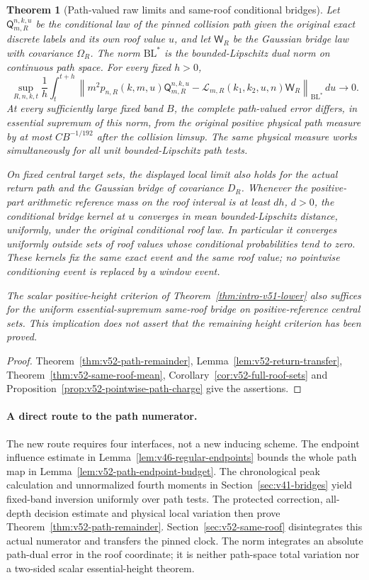 \documentclass[11pt,reqno]{amsart}
\numberwithin{equation}{section}
\newtheorem{leadtheorem}{Theorem}
\theoremstyle{definition}\newtheorem{definition}[theorem]{Definition}
\theoremstyle{remark}\newtheorem{remark}[theorem]{Remark}
\begin{document}
\begin{leadtheorem}[Path-valued raw limits and same-roof conditional bridges]
\label{thm:intro-v52-path}
Let $\mathsf Q_{m,R}^{n,k,u}$ be the conditional law of the pinned
collision path given the original exact discrete labels and its own
roof value $u$, and let $\mathsf W_R$ be the Gaussian bridge law with
covariance $\Omega_R$. The norm $\mathrm{BL}^*$ is the bounded-Lipschitz
dual norm on continuous path space. For every fixed $h>0$,
\[
 \sup_{R,n,k,t}\frac1h\int_t^{t+h}
 \left\|m^2p_{n,R}(k,m,u)\mathsf Q_{m,R}^{n,k,u}
      -\mathcal L_{m,R}(k_1,k_2,u,n)\mathsf W_R\right\|_{\mathrm{BL}^*}
 \,du\longrightarrow0.
\]
At every sufficiently large fixed band $B$, the complete path-valued
error differs, in essential supremum of this norm, from the original
positive physical path measure by at most $CB^{-1/192}$ after the
collision limsup. The same physical measure works simultaneously for
all unit bounded-Lipschitz path tests.

On fixed central target sets, the displayed local limit also holds
for the actual return path and the Gaussian bridge of covariance
$D_R$. Whenever the positive-part arithmetic reference mass on the
roof interval is at least $dh$, $d>0$, the conditional bridge kernel
at $u$ converges in mean bounded-Lipschitz distance, uniformly, under
the original conditional roof law. In particular it converges uniformly
outside sets of roof values whose conditional probabilities tend to
zero. These kernels fix the same exact event and the same roof value;
no pointwise conditioning event is replaced by a window event.

The scalar positive-height criterion of Theorem~\ref{thm:intro-v51-lower}
also suffices for the uniform essential-supremum same-roof bridge on
positive-reference central sets. This implication does not assert that
the remaining height criterion has been proved.
\end{leadtheorem}
\begin{proof}
Theorem~\ref{thm:v52-path-remainder}, Lemma~\ref{lem:v52-return-transfer},
Theorem~\ref{thm:v52-same-roof-mean},
Corollary~\ref{cor:v52-full-roof-sets} and
Proposition~\ref{prop:v52-pointwise-path-charge} give the assertions.
\end{proof}

\paragraph{A direct route to the path numerator.}
The new route requires four interfaces, not a new inducing scheme.
The endpoint influence estimate in
Lemma~\ref{lem:v46-regular-endpoints} bounds the whole path map in
Lemma~\ref{lem:v52-path-endpoint-budget}. The chronological peak
calculation and unnormalized fourth moments in
Section~\ref{sec:v41-bridges} yield fixed-band inversion uniformly over
path tests. The protected correction, all-depth decision estimate and
physical local variation then prove
Theorem~\ref{thm:v52-path-remainder}. Section~\ref{sec:v52-same-roof}
disintegrates this actual numerator and transfers the pinned clock.
The norm integrates an absolute path-dual error in the roof coordinate;
it is neither path-space total variation nor a two-sided scalar
essential-height theorem.
\end{document}
